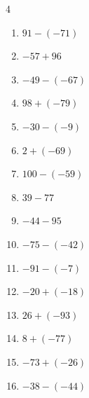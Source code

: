 \begin{multicols}{4}
\begin{enumerate}
\columnbreak %

  \item $91-(-71)$

        \phantom{$=162$}

  \item $-57+96$

        \phantom{$=39$}

  \item $-49-(-67)$

        \phantom{$=18$}

  \item $98+(-79)$

        \phantom{$=19$}

  \item $-30-(-9)$

        \phantom{$=-21$}

  \item $2+(-69)$

        \phantom{$=-67$}

  \item $100-(-59)$

        \phantom{$=159$}

  \item $39-77$

        \phantom{$=-38$}

  \item $-44-95$

        \phantom{$=-139$}

  \item $-75-(-42)$

        \phantom{$=-33$}

  \item $-91-(-7)$

        \phantom{$=-84$}

  \item $-20+(-18)$

        \phantom{$=-38$}

  \item $26+(-93)$

        \phantom{$=-67$}

  \item $8+(-77)$

        \phantom{$=-69$}

  \item $-73+(-26)$

        \phantom{$=-99$}

  \item $-38-(-44)$


\end{enumerate}
\end{multicols}
